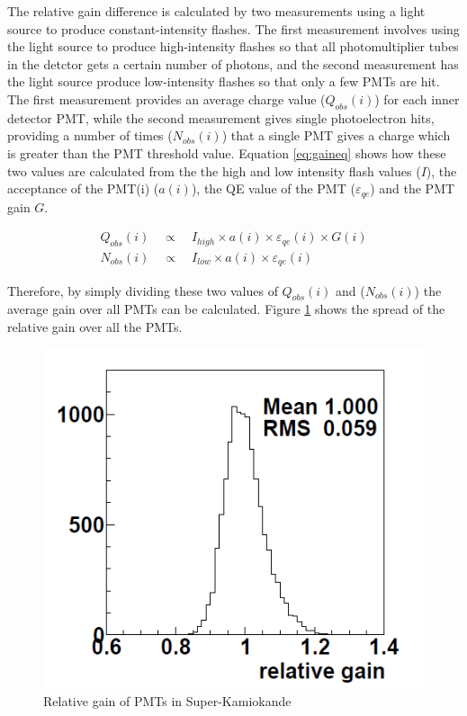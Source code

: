 The relative gain difference is calculated by two measurements using a light source to produce constant-intensity flashes. The first measurement involves using the light source to produce high-intensity flashes so that all photomultiplier tubes in the detctor gets a certain number of photons, and the second measurement has the light source produce low-intensity flashes so that only a few PMTs are hit. The first measurement provides an average charge value ($Q_{o b s}(i)$) for each inner detector PMT, while the second measurement gives single photoelectron hits, providing a number of times ($N_{o b s}(i)$) that a single PMT gives a charge which is greater than the PMT threshold value. Equation \ref{eq:gaineq} shows how these two values are calculated from the the high and low intensity flash values ($I$), the acceptance of the PMT(i) ($a(i)$), the QE value of the PMT ($\varepsilon_{q e}$) and the PMT gain $G$. 

\begin{align}
Q_{o b s}(i) \quad \propto \quad I_{high} \times a(i) \times \varepsilon_{q e}(i) \times G(i) \\
N_{o b s}(i) \quad \propto \quad I_{low} \times a(i) \times \varepsilon_{q e}(i)
\end{align}
\label{eq:gaineq}

Therefore, by simply dividing these two values of $Q_{o b s}(i)$ and ($N_{o b s}(i)$) the average gain over all PMTs can be calculated.  Figure \ref{fig:relativegain} shows the spread of the relative gain over all the PMTs. 

\begin{figure}
    \includegraphics[width=\textwidth]{Figures/relativegain.png}
\caption{Relative gain of PMTs in Super-Kamiokande}
    \label{fig:relativegain}
\end{figure}

